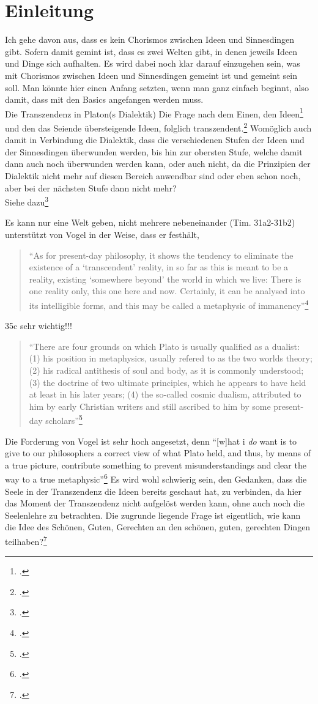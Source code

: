 \documentclass[12pt]{article}
\newcommand*{\zitatblock}[1]{%
    \begin{quote}
    \fontsize{10}{12}\selectfont
    \setlength{\parskip}{1.0em}
    #1
    \end{quote}
}
\begin{document}
\section{Einleitung}
Ich gehe davon aus, dass es kein Chorismos zwischen Ideen und Sinnesdingen gibt. Sofern damit gemint ist, dass es zwei Welten gibt, in denen jeweils Ideen und Dinge sich aufhalten. Es wird dabei noch klar darauf einzugehen sein, was mit Chorismos zwischen Ideen und Sinnesdingen gemeint ist und gemeint sein soll. 
Man könnte hier einen Anfang setzten, wenn man ganz einfach beginnt, also damit, dass mit den Basics angefangen werden muss.\\
Die Transzendenz in Platon(s Dialektik) 
Die Frage nach dem Einen, den Ideen\footcite[][]{Staudacher} und den das Seiende übersteigende Ideen, folglich transzendent.\footcite[][]{Bordt}
Womöglich auch damit in Verbindung die Dialektik, dass die verschiedenen Stufen der Ideen und der Sinnesdingen überwunden werden, bis hin zur obersten Stufe, welche damit dann auch noch überwunden werden kann, oder auch nicht, da die Prinzipien der Dialektik nicht mehr auf diesen Bereich anwendbar sind oder eben schon noch, aber bei der nächsten Stufe dann nicht mehr?\\
Siehe dazu\footcite[vgl.][S. 104ff]{Hirschberger}

Es kann nur eine Welt geben, nicht mehrere nebeneinander (Tim. 31a2-31b2)
unterstützt von Vogel in der Weise, dass er festhält, \zitatblock{\enquote{As for present-day philosophy, it shows the tendency to eliminate the existence of a \enquote{transcendent} reality, in so far as this is meant to be a reality, existing \enquote{somewhere beyond} the world in which we live: There is one reality only, this one here and now. Certainly, it can be analysed into its intelligible forms, and this may be called a metaphysic of immanency}\footcite[][S. 161]{Vogel}}
35c sehr wichtig!!!
\zitatblock{\enquote{There are four grounds on which Plato is usually qualified as a dualist: (1) his position in metaphysics, usually refered to as the two worlds theory; (2) his radical antithesis of soul and body, as it is commonly understood; (3) the doctrine of two ultimate principles, which he appears to have held at least in his later years; (4) the so-called cosmic dualism, attributed to him by early Christian writers and still ascribed to him by some present-day scholars}\footcite[][S. 159]{Vogel}}
Die Forderung von Vogel ist sehr hoch angesetzt, denn \enquote{[w]hat i \emph{do} want is to give to our philosophers a correct view of what Plato held, and thus, by means of a true picture, contribute something to prevent misunderstandings and clear the way to a true metaphysic}\footcite[vgl.][S. 161]{Vogel}
Es wird wohl schwierig sein, den Gedanken, dass die Seele in der Transzendenz die Ideen bereits geschaut hat, zu verbinden, da hier das Moment der Transzendenz nicht aufgelöst werden kann, ohne auch noch die Seelenlehre zu betrachten.
Die zugrunde liegende Frage ist eigentlich, wie kann die Idee des Schönen, Guten, Gerechten an den schönen, guten, gerechten Dingen teilhaben?\footcite[vgl.][S. 16]{Martin73}
\end{document}
